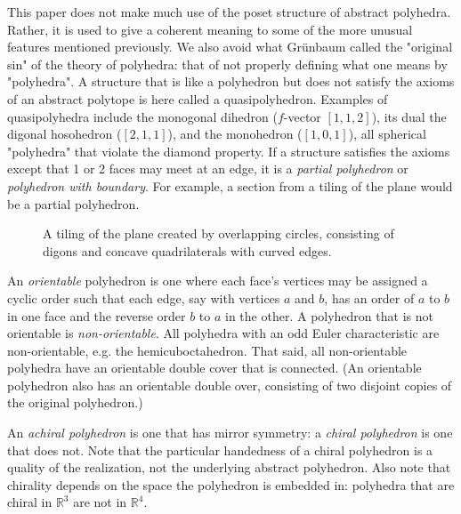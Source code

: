 \documentclass[12pt]{amsart}%
\begin{document}
This paper does not make much use of the poset structure of abstract polyhedra.
Rather, it is used to give a coherent meaning to some of the more unusual
features mentioned previously. We also avoid what Gr\"unbaum called the
"original sin" of the theory of polyhedra: that of not properly defining what
one means by "polyhedra".\cite{grunbaum03} A structure that is like a polyhedron
but does not
satisfy the axioms of an abstract polytope is here called a quasipolyhedron.
Examples of quasipolyhedra include the monogonal dihedron ($f$-vector
$[1,1,2]$), its dual the digonal hosohedron ($[2,1,1]$), and the monohedron
($[1,0,1]$), all spherical "polyhedra" that violate the diamond property.
If a structure satisfies the axioms except that 1 or 2 faces may meet at an
edge, it is a \textit{partial polyhedron} or \textit{polyhedron with
boundary}. For example, a section from a tiling of the plane would be a
partial polyhedron.

\begin{figure}[!htbp]
\caption{A tiling of the plane created by overlapping circles, consisting of
digons and concave quadrilaterals with curved edges.}
\label{fig:circlesquare}
\end{figure}

An \textit{orientable} polyhedron is one where each face's vertices may be
assigned a cyclic order such that each edge, say with vertices $a$ and $b$,
has an order of $a$ to $b$ in one face and the reverse order $b$ to $a$ in the
other. \cite{grunbaum94} A polyhedron that is not orientable is
\textit{non-orientable}. All polyhedra with an odd Euler characteristic are
non-orientable, e.g. the hemicuboctahedron. That said, all non-orientable
polyhedra have an orientable double cover that is connected. (An orientable
polyhedron also has an orientable double over, consisting of two disjoint
copies of the original polyhedron.)

An \textit{achiral polyhedron} is one that has mirror symmetry:
a \textit{chiral polyhedron} is one that does not. Note that the particular
handedness of a chiral polyhedron is a quality of the realization, not the
underlying abstract polyhedron.
Also note that chirality depends on the space the polyhedron is embedded in:
polyhedra that are chiral in $\mathbb{R}^3$ are not in $\mathbb{R}^4$.
\end{document}
